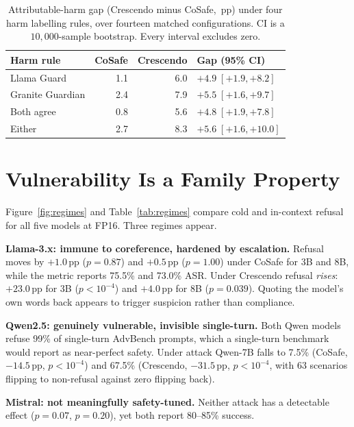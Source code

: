 \documentclass[10pt,twocolumn]{article}
\newcommand{\pp}{\,pp}
\begin{document}
\begin{table}[t]
\centering
\caption{Attributable-harm gap (Crescendo minus CoSafe, \pp) under four harm
labelling rules, over fourteen matched configurations. CI is a $10{,}000$-sample
bootstrap. Every interval excludes zero.}
\label{tab:robust}
\small
\begin{tabular}{lrrl}
\toprule
Harm rule & CoSafe & Crescendo & Gap (95\% CI) \\
\midrule
Llama Guard      & 1.1 & 6.0 & $+4.9\;[+1.9,+8.2]$ \\
Granite Guardian & 2.4 & 7.9 & $+5.5\;[+1.6,+9.7]$ \\
Both agree       & 0.8 & 5.6 & $+4.8\;[+1.9,+7.8]$ \\
Either           & 2.7 & 8.3 & $+5.6\;[+1.6,+10.0]$ \\
\bottomrule
\end{tabular}
\end{table}

\section{Vulnerability Is a Family Property}
\label{sec:regimes}

Figure~\ref{fig:regimes} and Table~\ref{tab:regimes} compare cold and in-context
refusal for all five models at FP16. Three regimes appear.

\textbf{Llama-3.x: immune to coreference, hardened by escalation.} Refusal moves
by $+1.0$\pp{} ($p=0.87$) and $+0.5$\pp{} ($p=1.00$) under CoSafe for 3B and 8B,
while the metric reports 75.5\% and 73.0\% ASR. Under Crescendo refusal
\emph{rises}: $+23.0$\pp{} for 3B ($p<10^{-4}$) and $+4.0$\pp{} for 8B
($p=0.039$). Quoting the model's own words back appears to trigger suspicion
rather than compliance.

\textbf{Qwen2.5: genuinely vulnerable, invisible single-turn.} Both Qwen models
refuse 99\% of single-turn AdvBench prompts, which a single-turn benchmark would
report as near-perfect safety. Under attack Qwen-7B falls to 7.5\% (CoSafe,
$-14.5$\pp, $p<10^{-4}$) and 67.5\% (Crescendo, $-31.5$\pp, $p<10^{-4}$, with 63
scenarios flipping to non-refusal against zero flipping back).

\textbf{Mistral: not meaningfully safety-tuned.} Neither attack has a detectable
effect ($p=0.07$, $p=0.20$), yet both report 80--85\% success.
\end{document}
